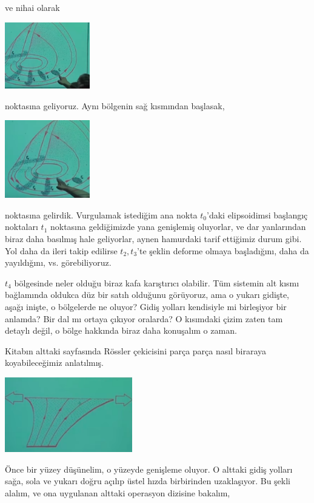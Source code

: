 \documentclass[12pt,fleqn]{article}\usepackage{../../common}
\begin{document}
ve nihai olarak 

\includegraphics[width=10em]{23_14.png}

noktasına geliyoruz. Aynı bölgenin sağ kısmından başlasak,

\includegraphics[width=10em]{23_15.png}

noktasına gelirdik. Vurgulamak istediğim ana nokta $t_0$'daki elipsoidimsi
başlangıç noktaları $t_1$ noktasına geldiğimizde yana genişlemiş oluyorlar, ve
dar yanlarından biraz daha basılmış hale geliyorlar, aynen hamurdaki tarif
ettiğimiz durum gibi. Yol daha da ileri takip edilirse $t_2,t_3$'te şeklin
deforme olmaya başladığını, daha da yayıldığını, vs. görebiliyoruz.

$t_4$ bölgesinde neler olduğu biraz kafa karıştırıcı olabilir. Tüm sistemin alt
kısmı bağlamında oldukca düz bir satıh olduğunu görüyoruz, ama o yukarı gidişte,
aşağı inişte, o bölgelerde ne oluyor? Gidiş yolları kendisiyle mi birleşiyor bir
anlamda? Bir dal mı ortaya çıkıyor oralarda? O kısımdaki çizim zaten tam detaylı
değil, o bölge hakkında biraz daha konuşalım o zaman.

Kitabın alttaki sayfasında Rössler çekicisini parça parça nasıl biraraya
koyabileceğimiz anlatılmış.

\includegraphics[width=15em]{23_16.png}

Önce bir yüzey düşünelim, o yüzeyde genişleme oluyor. O alttaki gidiş yolları
sağa, sola ve yukarı doğru açılıp üstel hızda birbirinden uzaklaşıyor. Bu şekli
alalım, ve ona uygulanan alttaki operasyon dizisine bakalım,
\end{document}
